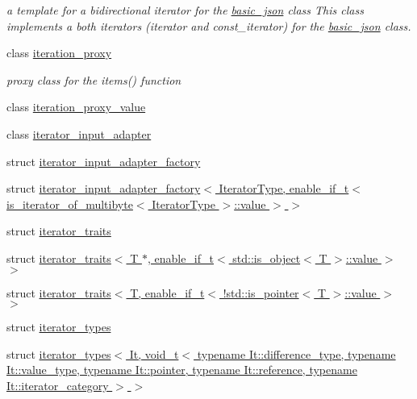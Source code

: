 \begin{DoxyCompactItemize}
\begin{DoxyCompactList}\small\item\em a template for a bidirectional iterator for the \hyperlink{classnlohmann_1_1basic__json}{basic\+\_\+json} class This class implements a both iterators (iterator and const\+\_\+iterator) for the \hyperlink{classnlohmann_1_1basic__json}{basic\+\_\+json} class. \end{DoxyCompactList}\item 
class \hyperlink{classnlohmann_1_1detail_1_1iteration__proxy}{iteration\+\_\+proxy}
\begin{DoxyCompactList}\small\item\em proxy class for the items() function \end{DoxyCompactList}\item 
class \hyperlink{classnlohmann_1_1detail_1_1iteration__proxy__value}{iteration\+\_\+proxy\+\_\+value}
\item 
class \hyperlink{classnlohmann_1_1detail_1_1iterator__input__adapter}{iterator\+\_\+input\+\_\+adapter}
\item 
struct \hyperlink{structnlohmann_1_1detail_1_1iterator__input__adapter__factory}{iterator\+\_\+input\+\_\+adapter\+\_\+factory}
\item 
struct \hyperlink{structnlohmann_1_1detail_1_1iterator__input__adapter__factory_3_01IteratorType_00_01enable__if__0e86378a778d78dd2284e92dc30f4902}{iterator\+\_\+input\+\_\+adapter\+\_\+factory$<$ Iterator\+Type, enable\+\_\+if\+\_\+t$<$ is\+\_\+iterator\+\_\+of\+\_\+multibyte$<$ Iterator\+Type $>$\+::value $>$ $>$}
\item 
struct \hyperlink{structnlohmann_1_1detail_1_1iterator__traits}{iterator\+\_\+traits}
\item 
struct \hyperlink{structnlohmann_1_1detail_1_1iterator__traits_3_01T_01_5_00_01enable__if__t_3_01std_1_1is__object_3_01T_01_4_1_1value_01_4_01_4}{iterator\+\_\+traits$<$ T $\ast$, enable\+\_\+if\+\_\+t$<$ std\+::is\+\_\+object$<$ T $>$\+::value $>$ $>$}
\item 
struct \hyperlink{structnlohmann_1_1detail_1_1iterator__traits_3_01T_00_01enable__if__t_3_01_9std_1_1is__pointer_3_01T_01_4_1_1value_01_4_01_4}{iterator\+\_\+traits$<$ T, enable\+\_\+if\+\_\+t$<$ !std\+::is\+\_\+pointer$<$ T $>$\+::value $>$ $>$}
\item 
struct \hyperlink{structnlohmann_1_1detail_1_1iterator__types}{iterator\+\_\+types}
\item 
struct \hyperlink{structnlohmann_1_1detail_1_1iterator__types_3_01It_00_01void__t_3_01typename_01It_1_1difference_d2be8685966c97e00e99d4fd2366dc0b}{iterator\+\_\+types$<$ It, void\+\_\+t$<$ typename It\+::difference\+\_\+type, typename It\+::value\+\_\+type, typename It\+::pointer, typename It\+::reference, typename It\+::iterator\+\_\+category $>$ $>$}

\end{DoxyCompactItemize}
